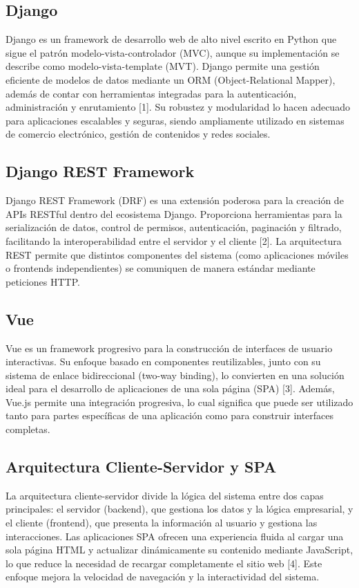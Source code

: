\documentclass[conference]{IEEEtran}
\begin{document}
\subsection{Django}
Django es un framework de desarrollo web de alto nivel escrito en Python que sigue el patrón modelo-vista-controlador (MVC), aunque su implementación se describe como modelo-vista-template (MVT). Django permite una gestión eficiente de modelos de datos mediante un ORM (Object-Relational Mapper), además de contar con herramientas integradas para la autenticación, administración y enrutamiento [1]. Su robustez y modularidad lo hacen adecuado para aplicaciones escalables y seguras, siendo ampliamente utilizado en sistemas de comercio electrónico, gestión de contenidos y redes sociales.

\subsection{Django REST Framework}
Django REST Framework (DRF) es una extensión poderosa para la creación de APIs RESTful dentro del ecosistema Django. Proporciona herramientas para la serialización de datos, control de permisos, autenticación, paginación y filtrado, facilitando la interoperabilidad entre el servidor y el cliente [2]. La arquitectura REST permite que distintos componentes del sistema (como aplicaciones móviles o frontends independientes) se comuniquen de manera estándar mediante peticiones HTTP.

\subsection{Vue}
Vue es un framework progresivo para la construcción de interfaces de usuario interactivas. Su enfoque basado en componentes reutilizables, junto con su sistema de enlace bidireccional (two-way binding), lo convierten en una solución ideal para el desarrollo de aplicaciones de una sola página (SPA) [3]. Además, Vue.js permite una integración progresiva, lo cual significa que puede ser utilizado tanto para partes específicas de una aplicación como para construir interfaces completas.

\subsection{Arquitectura Cliente-Servidor y SPA}
La arquitectura cliente-servidor divide la lógica del sistema entre dos capas principales: el servidor (backend), que gestiona los datos y la lógica empresarial, y el cliente (frontend), que presenta la información al usuario y gestiona las interacciones. Las aplicaciones SPA ofrecen una experiencia fluida al cargar una sola página HTML y actualizar dinámicamente su contenido mediante JavaScript, lo que reduce la necesidad de recargar completamente el sitio web [4]. Este enfoque mejora la velocidad de navegación y la interactividad del sistema.
\end{document}
